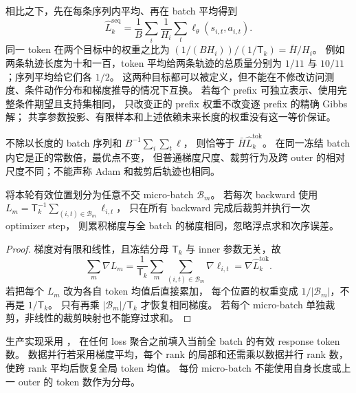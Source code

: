 相比之下，先在每条序列内平均、再在 batch 平均得到
\begin{equation}
 \widehat L_k^{\mathrm{seq}}=
 \frac1B\sum_i\frac1{H_i}\sum_t\ell_\theta(s_{i,t},a_{i,t}).
\end{equation}
同一 token 在两个目标中的权重之比为
$(1/(BH_i))/(1/\mathsf T_k)=\bar H/H_i$。
例如两条轨迹长度为十和一百，token 平均给两条轨迹的总质量分别为
$1/11$ 与 $10/11$；序列平均给它们各 $1/2$。
这两种目标都可以被定义，但不能在不修改访问测度、条件动作分布和梯度推导的情况下互换。
若每个 prefix 可独立表示、使用完整条件期望且支持集相同，
只改变正的 prefix 权重不改变逐 prefix 的精确 Gibbs 解；
共享参数投影、有限样本和上述依赖未来长度的权重没有这一等价保证。

不除以长度的 batch 序列和 $B^{-1}\sum_i\sum_t\ell$，
则恰等于 $\bar H\widehat L_k^{\mathrm{tok}}$。
在同一冻结 batch 内它是正的常数倍，最优点不变，
但普通梯度尺度、裁剪行为及跨 outer 的相对尺度不同；不能声称 Adam 和裁剪后轨迹也相同。

\begin{proposition}
将本轮有效位置划分为任意不交 micro-batch $\mathcal B_m$。
若每次 backward 使用
$L_m=\mathsf T_k^{-1}\sum_{(i,t)\in\mathcal B_m}\ell_{i,t}$，
只在所有 backward 完成后裁剪并执行一次 optimizer step，
则累积梯度与全 batch 的梯度相同，忽略浮点求和次序误差。
\end{proposition}
\begin{proof}
梯度对有限和线性，且冻结分母 $\mathsf T_k$ 与 inner 参数无关，故
\begin{equation}
 \sum_m\nabla L_m
 =\frac1{\mathsf T_k}\sum_m\sum_{(i,t)\in\mathcal B_m}\nabla\ell_{i,t}
 =\nabla\widehat L_k^{\mathrm{tok}}.
\end{equation}
若把每个 $L_m$ 改为各自 token 均值后直接累加，
每个位置的权重变成 $1/|\mathcal B_m|$，不再是 $1/\mathsf T_k$。
只有再乘 $|\mathcal B_m|/\mathsf T_k$ 才恢复相同梯度。
若每个 micro-batch 单独裁剪，非线性的裁剪映射也不能穿过求和。
\end{proof}

生产实现采用 ，
在任何 loss 聚合之前填入当前全 batch 的有效 response token 数。
数据并行若采用梯度平均，每个 rank 的局部和还需乘以数据并行 rank 数，
使跨 rank 平均后恢复全局 token 均值。
每份 micro-batch 不能使用自身长度或上一 outer 的 token 数作为分母。

